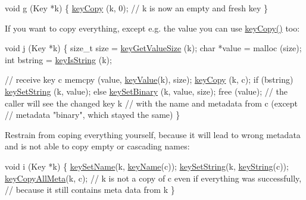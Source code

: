 \begin{DoxyCodeInclude}
\textcolor{keywordtype}{void} g (Key *k)
\{
        \hyperlink{group__key_ga6a12cbbe656a1ad9f41b8c681d7a2f92}{keyCopy} (k, 0);
        \textcolor{comment}{// k is now an empty and fresh key}
\}
\end{DoxyCodeInclude}
 If you want to copy everything, except e.\-g. the value you can use \hyperlink{group__key_ga6a12cbbe656a1ad9f41b8c681d7a2f92}{key\-Copy()} too\-:


\begin{DoxyCodeInclude}
\textcolor{keywordtype}{void} j (Key *k)
\{
        \textcolor{keywordtype}{size\_t} size = \hyperlink{group__keyvalue_gae326672fffb7474abfe9baf53b73217e}{keyGetValueSize} (k);
        \textcolor{keywordtype}{char} *value = malloc (size);
        \textcolor{keywordtype}{int} bstring = \hyperlink{group__keytest_gaea7670778abd07fee0fe8ac12a149190}{keyIsString} (k);

        \textcolor{comment}{// receive key c}
        memcpy (value, \hyperlink{group__keyvalue_ga6f29609c5da53c6dc26a98678d5752af}{keyValue}(k), size);
        \hyperlink{group__key_ga6a12cbbe656a1ad9f41b8c681d7a2f92}{keyCopy} (k, c);
        \textcolor{keywordflow}{if} (bstring) \hyperlink{group__keyvalue_ga622bde1eb0e0c4994728331326340ef2}{keySetString} (k, value);
        \textcolor{keywordflow}{else} \hyperlink{group__keyvalue_gaa50a5358fd328d373a45f395fa1b99e7}{keySetBinary} (k, value, size);
        free (value);
        \textcolor{comment}{// the caller will see the changed key k}
        \textcolor{comment}{// with the name and metadata from c (except}
        \textcolor{comment}{// metadata "binary", which stayed the same)}
\}
\end{DoxyCodeInclude}
 Restrain from coping everything yourself, because it will lead to wrong metadata and is not able to copy empty or cascading names\-:


\begin{DoxyCodeInclude}
\textcolor{keywordtype}{void} i (Key *k)
\{
        \hyperlink{group__keyname_ga7699091610e7f3f43d2949514a4b35d9}{keySetName}(k, \hyperlink{group__keyname_ga8e805c726a60da921d3736cda7813513}{keyName}(c));
        \hyperlink{group__keyvalue_ga622bde1eb0e0c4994728331326340ef2}{keySetString}(k, \hyperlink{group__keyvalue_ga880936f2481d28e6e2acbe7486a21d05}{keyString}(c));
        \hyperlink{group__keymeta_ga8e63720a65610a29597494d0671f9401}{keyCopyAllMeta}(k, c);
        \textcolor{comment}{// k is not a copy of c even if everything was successfully,}
        \textcolor{comment}{// because it still contains meta data from k}
\}
\end{DoxyCodeInclude}
 
